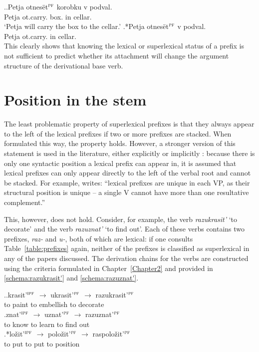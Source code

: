\ex.\label{ex:otnesti}\ag.Petja otnes\"{e}t$^{\textsc{pf}}$ korobku v podval.\\
Petja ot.carry. box. in cellar.\\
\trans `Petja will carry the box to the cellar.'
\bg.*Petja otnes\"{e}t$^{\textsc{pf}}$ v podval.\\
Petja ot.carry. in cellar.\\

This clearly shows that knowing the lexical or superlexical status of a prefix is not sufficient to predict whether its attachment will change the argument structure of the derivational base verb.
\section{Position in the stem}\label{section:new:position}
The least problematic property of superlexical prefixes is that they always appear to the left of the lexical prefixes if two or more prefixes are stacked. When formulated this way, the property holds. However, a stronger version of this statement is used in the literature, either explicitly \citep{Svenonius:04b} or implicitly \citep{Tatevosov:09}: because there is only one syntactic position a lexical prefix can appear in, it is assumed that lexical prefixes can only appear directly to the left of the verbal root and cannot be stacked. For example, \citet[206]{Svenonius:04b} writes: ``lexical prefixes are unique in each VP, as their structural position is unique -- a single V cannot have more than one resultative complement.''


This, however, does not hold. Consider, for example, the verb \textit{razukrasit'} `to decorate' and the verb \textit{razuznat'} `to find out'. Each of these verbs contains two prefixes, \textit{raz-} and \textit{u-}, both of which are lexical: if one consults Table~\ref{table:prefixes} again, neither of the prefixes is classified as superlexical in any of the papers discussed. The derivation chains for the verbs are constructed using the criteria formulated in Chapter~\ref{Chapter2} and provided in \ref{schema:razukrasit'} and \ref{schema:razuznat'}.

\ex.\ag.\label{schema:razukrasit'}krasit'$^{\textsc{ipf}}$ {$\rightarrow$} ukrasit'$^{\textsc{pf}}$ {$\rightarrow$} razukrasit'$^{\textsc{pf}}$\\
{to paint} {} {to embellish} {} {to decorate}\\
\bg.\label{schema:razuznat'}znat'$^{\textsc{ipf}}$ {$\rightarrow$} uznat'$^{\textsc{pf}}$ {$\rightarrow$} razuznat'$^{\textsc{pf}}$\\
{to know} {} {to learn} {} {to find out}\\
\bg.*lo\v{z}it'$^{\textsc{ipf}}$ {$\rightarrow$} polo\v{z}it'$^{\textsc{pf}}$ {$\rightarrow$} raspolo\v{z}it'$^{\textsc{pf}}$\label{schema:raspolozit'}\\
{to put} {} {to put} {} {to position}\\

